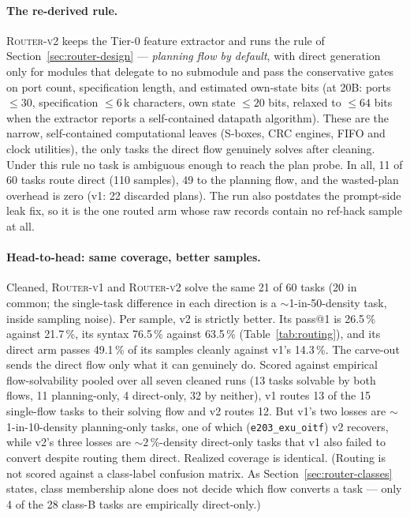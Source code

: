 \paragraph{The re-derived rule.}
\textsc{Router-v2} keeps the Tier-0 feature extractor and runs the
rule of Section~\ref{sec:router-design} --- \emph{planning flow by
default}, with direct generation only for modules that delegate to no
submodule and pass the conservative gates on port count, specification
length, and estimated own-state bits (at 20B: ports $\leq 30$,
specification $\leq 6$\,k characters, own state $\leq 20$ bits,
relaxed to $\leq 64$ bits when the extractor reports a self-contained
datapath algorithm). These
are the narrow, self-contained computational leaves (S-boxes, CRC
engines, FIFO and clock utilities), the only tasks the direct flow
genuinely solves after cleaning. Under this rule no task is ambiguous enough to
reach the plan probe. In all, 11 of 60 tasks route direct (110 samples), 49 to
the planning flow, and the wasted-plan overhead is zero (v1: 22 discarded
plans). The run also postdates the prompt-side leak fix, so it is the
one routed arm whose raw records contain no ref-hack sample at all.

\paragraph{Head-to-head: same coverage, better samples.}
Cleaned, \textsc{Router-v1} and \textsc{Router-v2} solve the same 21 of
60 tasks (20 in common; the single-task difference in each direction is
a ${\sim}$1-in-50-density task, inside sampling noise). Per sample, v2
is strictly better. Its pass@1 is
26.5\,\% against 21.7\,\%, its syntax 76.5\,\% against 63.5\,\%
(Table~\ref{tab:routing}), and its
direct arm passes 49.1\,\% of its samples cleanly against v1's
14.3\,\%. The carve-out sends the direct flow only what it can
genuinely do. Scored against empirical flow-solvability pooled over all
seven cleaned runs (13 tasks solvable by both flows, 11 planning-only,
4 direct-only, 32 by neither), v1 routes 13 of the 15 single-flow tasks
to their solving flow and v2 routes 12. But v1's two losses are
${\sim}$1-in-10-density planning-only tasks, one of which
(\texttt{e203\_exu\_oitf}) v2 recovers, while v2's three losses are
${\sim}2\,\%$-density direct-only tasks that v1 also failed to convert
despite routing them direct. Realized coverage is identical. (Routing
is not scored against a class-label confusion matrix. As
Section~\ref{sec:router-classes} states, class membership alone does
not decide which flow converts a task --- only 4 of the 28 class-B
tasks are empirically direct-only.)

